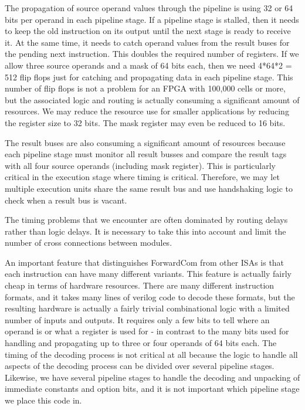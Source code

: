 \documentclass[11pt,a4paper,oneside,openright]{report}
\newcommand{\vv}{ \vspace{2mm} }   %
\begin{document}
The propagation of source operand values through the pipeline is using 32 or 64 bits per operand in each pipeline stage. If a pipeline stage is stalled, then it needs to keep the old instruction on its output until the next stage is ready to receive it. At the same time, it needs to catch operand values from the result buses for the pending next instruction. This doubles the required number of registers. If we allow three source operands and a mask of 64 bits each, then we need 4*64*2 = 512 flip flops just for catching and propagating data in each pipeline stage. This number of flip flops is not a problem for an FPGA with 100,000 cells or more, but the associated logic and routing is actually consuming a significant amount of resources. We may reduce the resource use for smaller applications by reducing the register size to 32 bits. The mask register may even be reduced to 16 bits.
\vv

The result buses are also consuming a significant amount of resources because each pipeline stage must monitor all result busses and compare the result tags with all four source operands (including mask register). This is particularly critical in the execution stage where timing is critical. 
Therefore, we may let multiple execution units share the same result bus and use handshaking logic to check when a result bus is vacant.
\vv

The timing problems that we encounter are often dominated by routing delays rather than logic delays. It is necessary to take this into account and limit the number of cross connections between modules.
\vv

An important feature that distinguishes ForwardCom from other ISAs is that each instruction can have many different variants. This feature is actually fairly cheap in terms of hardware resources. There are many different instruction formats, and it takes many lines of verilog code to decode these formats, but the resulting hardware is actually a fairly trivial combinational logic with a limited number of inputs and outputs. It requires only a few bits to tell where an operand is or what a register is used for - in contrast to the many bits used for handling and propagating up to three or four operands of 64 bits each. The timing of the decoding process is not critical at all because the logic to handle all aspects of the decoding process can be divided over several pipeline stages. Likewise, we have several pipeline stages to handle the decoding and unpacking of immediate constants and option bits, and it is not important which pipeline stage we place this code in.
\vv
\end{document}
